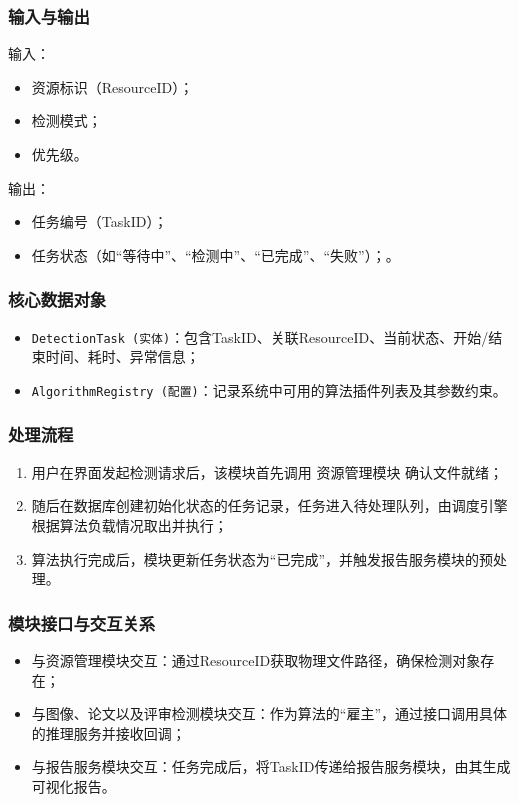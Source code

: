 \subsubsection{输入与输出}
输入：
\begin{itemize}[leftmargin=2em]
    \item 资源标识（ResourceID）；
    \item 检测模式；
    \item 优先级。
\end{itemize}

输出：
\begin{itemize}[leftmargin=2em]
    \item 任务编号（TaskID）；
    \item 任务状态（如“等待中”、“检测中”、“已完成”、“失败”）；。
\end{itemize}

\subsubsection{核心数据对象}
\begin{itemize}[leftmargin=2em]
    \item \texttt{DetectionTask (实体)}：包含TaskID、关联ResourceID、当前状态、开始/结束时间、耗时、异常信息；
    \item \texttt{AlgorithmRegistry (配置)}：记录系统中可用的算法插件列表及其参数约束。
\end{itemize}

\subsubsection{处理流程}
\begin{enumerate}[leftmargin=2em]
    \item 用户在界面发起检测请求后，该模块首先调用 资源管理模块 确认文件就绪；
    \item 随后在数据库创建初始化状态的任务记录，任务进入待处理队列，由调度引擎根据算法负载情况取出并执行；
    \item 算法执行完成后，模块更新任务状态为“已完成”，并触发报告服务模块的预处理。
\end{enumerate}

\subsubsection{模块接口与交互关系}
\begin{itemize}[leftmargin=2em]
    \item 与资源管理模块交互：通过ResourceID获取物理文件路径，确保检测对象存在；
    \item 与图像、论文以及评审检测模块交互：作为算法的“雇主”，通过接口调用具体的推理服务并接收回调；
    \item 与报告服务模块交互：任务完成后，将TaskID传递给报告服务模块，由其生成可视化报告。
\end{itemize}

